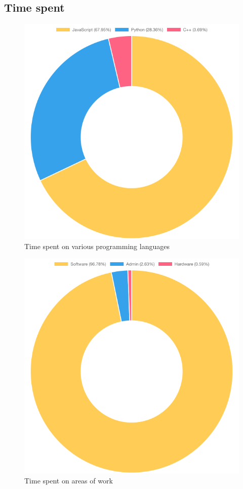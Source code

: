 \subsection{Time spent}

\begin{figure}[h]
\centering
\includegraphics[scale=0.5]{04_Artefakte/01_Abbildungen/time-spent-on-languages}
\caption[Time spent on languages]{Time spent on various programming languages\protect}
\label{fig:timeSpentLanguages}
\end{figure}

\begin{figure}[h]
\centering
\includegraphics[scale=0.5]{04_Artefakte/01_Abbildungen/time-spent-on-types-of-work}
\caption[Time spent on areas of work]{Time spent on areas of work\protect}
\label{fig:timeSpentTypeOfWork}
\end{figure}


